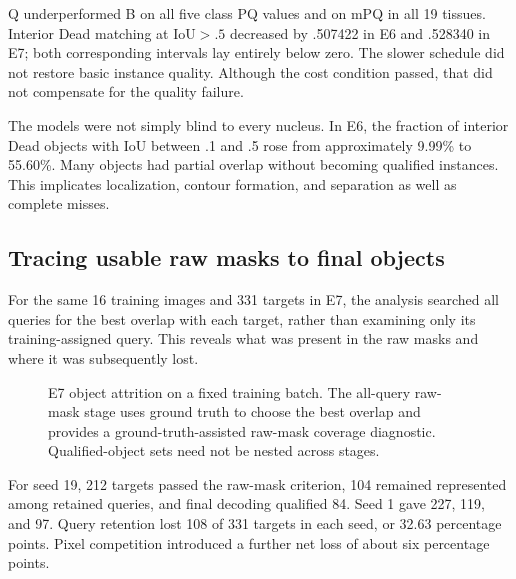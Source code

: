 \documentclass[11pt,a4paper]{article}
\begin{document}
Q underperformed B on all five class PQ values and on mPQ in all 19 tissues. Interior Dead matching at IoU$>.5$ decreased by .507422 in E6 and .528340 in E7; both corresponding intervals lay entirely below zero. The slower schedule did not restore basic instance quality. Although the cost condition passed, that did not compensate for the quality failure.

The models were not simply blind to every nucleus. In E6, the fraction of interior Dead objects with IoU between .1 and .5 rose from approximately 9.99\% to 55.60\%. Many objects had partial overlap without becoming qualified instances. This implicates localization, contour formation, and separation as well as complete misses.

\subsection{Tracing usable raw masks to final objects}

For the same 16 training images and 331 targets in E7, the analysis searched all queries for the best overlap with each target, rather than examining only its training-assigned query. This reveals what was present in the raw masks and where it was subsequently lost.

\begin{figure}[H]\centering
{}
\caption{E7 object attrition on a fixed training batch. The all-query raw-mask stage uses ground truth to choose the best overlap and provides a ground-truth-assisted raw-mask coverage diagnostic. Qualified-object sets need not be nested across stages.}
\end{figure}

For seed 19, 212 targets passed the raw-mask criterion, 104 remained represented among retained queries, and final decoding qualified 84. Seed 1 gave 227, 119, and 97. Query retention lost 108 of 331 targets in each seed, or 32.63 percentage points. Pixel competition introduced a further net loss of about six percentage points.
\end{document}
